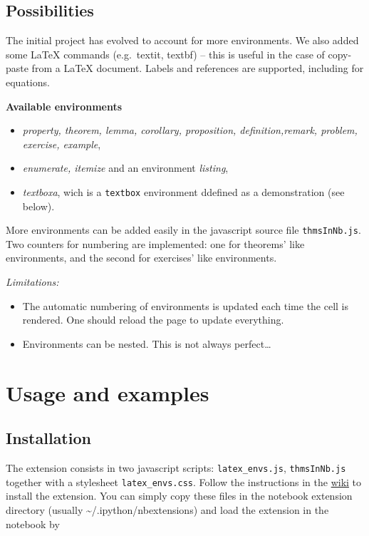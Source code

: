     \subsection{Possibilities}\label{possibilities}

    The initial project has evolved to account for more environments. We
also added some LaTeX commands (e.g.~textit, textbf) -- this is useful
in the case of copy-paste from a LaTeX document. Labels and references
are supported, including for equations.

\textbf{Available environments }

\begin{itemize}
\itemsep1pt\parskip0pt
\item
  \emph{property, theorem, lemma, corollary, proposition,
  definition,remark, problem, exercise, example},
\item
  \emph{enumerate, itemize} and an environment \emph{listing},
\item
  \emph{textboxa}, wich is a \texttt{textbox} environment ddefined as a
  demonstration (see below).
\end{itemize}

More environments can be added easily in the javascript source file
\texttt{thmsInNb.js}. Two counters for numbering are implemented: one
for theorems' like environments, and the second for exercises' like
environments.

\emph{Limitations:}

\begin{itemize}
\itemsep1pt\parskip0pt
\item
  The automatic numbering of environments is updated each time the cell
  is rendered. One should reload the page to update everything.
\item
  Environments can be nested. This is not always perfect\ldots{}
\end{itemize}

    \section{Usage and examples}\label{usage-and-examples}

    \subsection{Installation}\label{installation}

    The extension consists in two javascript scripts:
\texttt{latex\_envs.js}, \texttt{thmsInNb.js} together with a stylesheet
\texttt{latex\_envs.css}. Follow the instructions in the
\href{https://github.com/ipython-contrib/IPython-notebook-extensions/wiki}{wiki}
to install the extension. You can simply copy these files in the
notebook extension directory (usually
\textasciitilde{}/.ipython/nbextensions) and load the extension in the
notebook by

